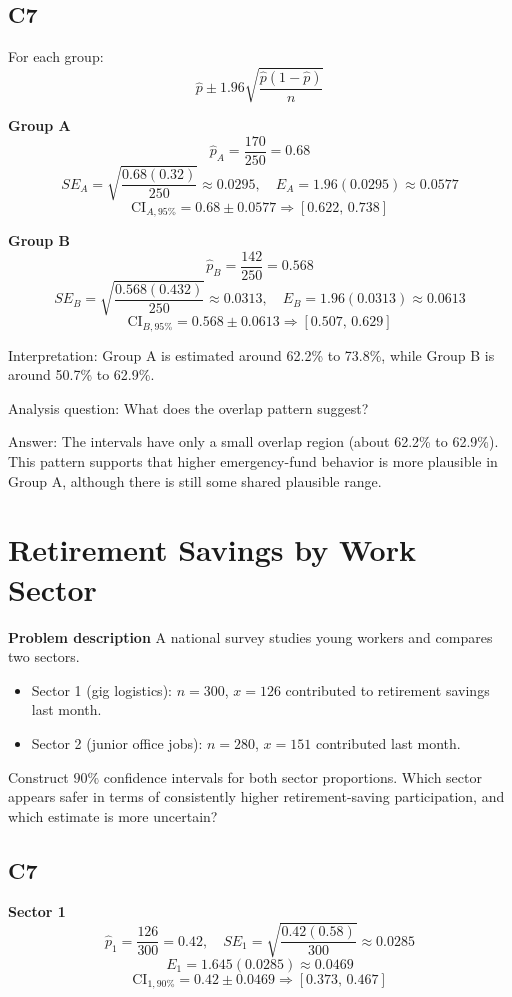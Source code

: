 	\subsection*{C7}
	For each group:
	\[
	\hat p \pm 1.96\sqrt{\frac{\hat p(1-\hat p)}{n}}
	\]
	
	\textbf{Group A}
	\[
	\hat p_A=\frac{170}{250}=0.68
	\]
	\[
	SE_A=\sqrt{\frac{0.68(0.32)}{250}}\approx 0.0295,
	\quad E_A=1.96(0.0295)\approx 0.0577
	\]
	\[
	\text{CI}_{A,95\%}=0.68\pm 0.0577\Rightarrow [0.622,\,0.738]
	\]
	
	\textbf{Group B}
	\[
	\hat p_B=\frac{142}{250}=0.568
	\]
	\[
	SE_B=\sqrt{\frac{0.568(0.432)}{250}}\approx 0.0313,
	\quad E_B=1.96(0.0313)\approx 0.0613
	\]
	\[
	\text{CI}_{B,95\%}=0.568\pm 0.0613\Rightarrow [0.507,\,0.629]
	\]
	
	Interpretation: Group A is estimated around 62.2\% to 73.8\%, while Group B is around 50.7\% to 62.9\%.
	
	Analysis question: What does the overlap pattern suggest?
	
	Answer: The intervals have only a small overlap region (about 62.2\% to 62.9\%). This pattern supports that higher emergency-fund behavior is more plausible in Group A, although there is still some shared plausible range.
	
	\section{Retirement Savings by Work Sector}
	\textbf{Problem description}
	A national survey studies young workers and compares two sectors.
	\begin{itemize}
		\item Sector 1 (gig logistics): \(n=300\), \(x=126\) contributed to retirement savings last month.
		\item Sector 2 (junior office jobs): \(n=280\), \(x=151\) contributed last month.
	\end{itemize}
	Construct \(90\%\) confidence intervals for both sector proportions. Which sector appears safer in terms of consistently higher retirement-saving participation, and which estimate is more uncertain?
	
	\subsection*{C7}
	\textbf{Sector 1}
	\[
	\hat p_1=\frac{126}{300}=0.42,
	\quad SE_1=\sqrt{\frac{0.42(0.58)}{300}}\approx 0.0285
	\]
	\[
	E_1=1.645(0.0285)\approx 0.0469
	\]
	\[
	\text{CI}_{1,90\%}=0.42\pm 0.0469\Rightarrow [0.373,\,0.467]
	\]
	
